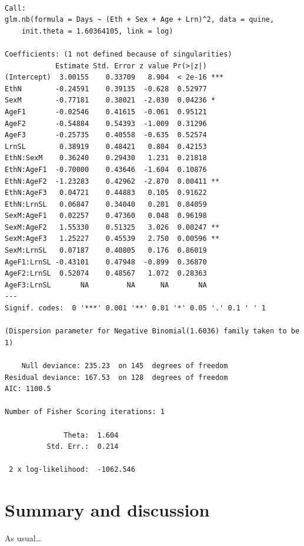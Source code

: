 \documentclass[
  nojss,
  article]{jss}
\begin{document}
\begin{verbatim}

Call:
glm.nb(formula = Days ~ (Eth + Sex + Age + Lrn)^2, data = quine, 
    init.theta = 1.60364105, link = log)

Coefficients: (1 not defined because of singularities)
            Estimate Std. Error z value Pr(>|z|)    
(Intercept)  3.00155    0.33709   8.904  < 2e-16 ***
EthN        -0.24591    0.39135  -0.628  0.52977    
SexM        -0.77181    0.38021  -2.030  0.04236 *  
AgeF1       -0.02546    0.41615  -0.061  0.95121    
AgeF2       -0.54884    0.54393  -1.009  0.31296    
AgeF3       -0.25735    0.40558  -0.635  0.52574    
LrnSL        0.38919    0.48421   0.804  0.42153    
EthN:SexM    0.36240    0.29430   1.231  0.21818    
EthN:AgeF1  -0.70000    0.43646  -1.604  0.10876    
EthN:AgeF2  -1.23283    0.42962  -2.870  0.00411 ** 
EthN:AgeF3   0.04721    0.44883   0.105  0.91622    
EthN:LrnSL   0.06847    0.34040   0.201  0.84059    
SexM:AgeF1   0.02257    0.47360   0.048  0.96198    
SexM:AgeF2   1.55330    0.51325   3.026  0.00247 ** 
SexM:AgeF3   1.25227    0.45539   2.750  0.00596 ** 
SexM:LrnSL   0.07187    0.40805   0.176  0.86019    
AgeF1:LrnSL -0.43101    0.47948  -0.899  0.36870    
AgeF2:LrnSL  0.52074    0.48567   1.072  0.28363    
AgeF3:LrnSL       NA         NA      NA       NA    
---
Signif. codes:  0 '***' 0.001 '**' 0.01 '*' 0.05 '.' 0.1 ' ' 1

(Dispersion parameter for Negative Binomial(1.6036) family taken to be 1)

    Null deviance: 235.23  on 145  degrees of freedom
Residual deviance: 167.53  on 128  degrees of freedom
AIC: 1100.5

Number of Fisher Scoring iterations: 1

              Theta:  1.604 
          Std. Err.:  0.214 

 2 x log-likelihood:  -1062.546 
\end{verbatim}

\section{Summary and discussion}\label{sec-summary}

\begin{tcolorbox}[enhanced jigsaw, bottomrule=.15mm, breakable, toprule=.15mm, opacityback=0, colframe=quarto-callout-color-frame, left=2mm, rightrule=.15mm, arc=.35mm, leftrule=.75mm, colback=white]

As usual\ldots{}

\end{tcolorbox}
\end{document}
